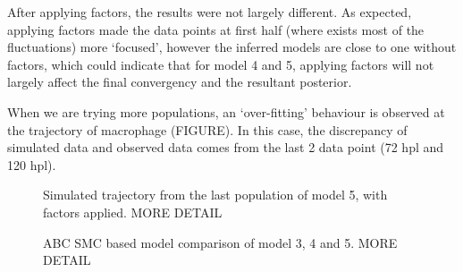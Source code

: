 After applying factors, the results were not largely different. As expected, applying factors made the data points at first half (where exists most of the fluctuations) more `focused', however the inferred models are close to one without factors, which could indicate that for model 4 and 5, applying factors will not largely affect the final convergency and the resultant posterior.

When we are trying more populations, an `over-fitting' behaviour is observed at the trajectory of macrophage (FIGURE). In this case, the discrepancy of simulated data and observed data comes from the last 2 data point (72 hpl and 120 hpl).

\begin{figure}[h]
    \begin{center}
    \end{center}

    \caption[Simulated trajectory from the last population of model 5, with factors applied]{Simulated trajectory from the last population of model 5, with factors applied. MORE DETAIL}
    \label{fig:overfit}
\end{figure}

\begin{figure}[H]
    \begin{center}
    \end{center}

    \caption[ABC SMC based model comparison of model 3, 4 and 5]{ABC SMC based model comparison of model 3, 4 and 5. MORE DETAIL}
    \label{fig:model345cmp}
\end{figure}


